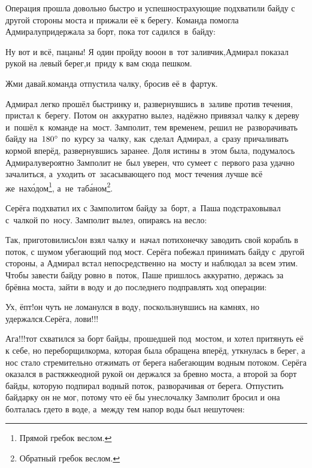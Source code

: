 Операция прошла довольно быстро и успешно\mdash страхующие подхватили байду с другой стороны моста и прижали её к берегу. Команда помогла Адмиралу\mdash придержала за борт, пока тот садился~в~байду:

\diagdash Ну вот и всё, пацаны! Я один пройду во\sdash о\sdash он в~тот заливчик,\mdash Адмирал показал рукой на левый берег,\mdash и~приду к вам сюда пешком.

\diagdash Жми давай.\mdash команда отпустила чалку, бросив её в~фартук.

\renewcommand*{\thefootnote}{\arabic{footnote}}
\setcounter{footnote}{0}

Адмирал легко прошёл быстринку и, развернувшись в~заливе против течения, пристал к~берегу. Потом он~аккуратно вылез, надёжно привязал чалку к дереву и~пошёл к~команде на~мост. Замполит, тем временем, решил не~разворачивать байду на~$180\degree$ по~курсу за~чалку, как~сделал Адмирал, а~сразу причаливать кормой вперёд, развернувшись заранее. Доля истины в~этом была, подумалось Адмиралу\mdash вероятно Замполит не~был уверен, что сумеет с~первого раза удачно зачалиться, а~уходить от~засасывающего под~мост течения лучше всё же~нах\'{о}дом\footnote{Прямой гребок веслом.}, а~не~таб\'{а}ном\footnote{Обратный гребок веслом.}. 

Серёга подхватил их с Замполитом байду за~борт, а~Паша подстраховывал с~чалкой по~носу. Замполит вылез, опираясь на весло:

\diagdash Так, приготовились!\mdash он взял чалку и~начал потихонечку заводить свой корабль в поток, с шумом убегающий под мост. Серёга побежал принимать байду с~другой стороны, а Адмирал встал непосредственно на~мосту и наблюдал за всем этим. Чтобы завести байду ровно в~поток, Паше пришлось аккуратно, держась за брёвна моста, зайти в воду и до последнего подправлять ход операции:

\diagdash Ух, ёпт!\mdash он чуть не ломанулся в воду, поскользнувшись на камнях, но удержался.\mdash Серёга, лови!!!
 
\diagdash Ага!!!\mdash тот схватился за борт байды, прошедшей под~мостом, и хотел притянуть её к себе, но переборщил\mdash корма, которая была обращена вперёд, уткнулась в берег, а нос стало стремительно отжимать от берега набегающим водным потоком. Серёга оказался в растяжке\mdash одной рукой он держался за бревно моста, а второй за борт байды, которую подпирал водный поток, разворачивая от берега. Отпустить байдарку он не мог, потому что её бы унесло\mdash чалку Замполит бросил и она болталась где\sdash то в воде, а~между тем напор воды был нешуточен:

